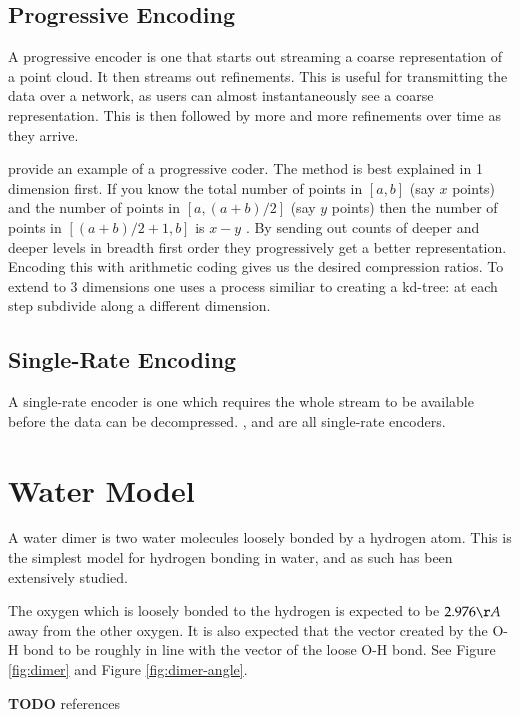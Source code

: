 \documentclass{report}
\newcommand{\todo}{\textbf{TODO} }
\begin{document}
\subsection{Progressive Encoding}

A progressive encoder is one that starts out streaming a coarse representation
of a point cloud. It then streams out refinements. This is useful for
transmitting the data over a network, as users can almost instantaneously see
a coarse representation. This is then followed by more and more refinements
over time as they arrive.

\citet{devillers2000gci} provide an example of a progressive coder. The method
is best explained in 1 dimension first. If you know the total number of points
in $[a, b]$ (say $x$ points) and the number of points in $[a, (a+b)/2]$ (say
$y$ points) then the number of points in $[(a+b)/2+1, b]$ is $x - y$ . By
sending out counts of deeper and deeper levels in breadth first order they
progressively get a better representation. Encoding this with arithmetic
coding gives us the desired compression ratios. To extend to 3 dimensions one
uses a process similiar to creating a kd-tree: at each step subdivide along a
different dimension.


\subsection{Single-Rate Encoding}

A single-rate encoder is one which requires the whole stream to be available
before the data can be decompressed. \citet{omeltchenko2000sls},
\citet{gumholdcomp} and \citet{merrycomp} are all single-rate encoders.


\section{Water Model}

A water dimer is two water molecules loosely bonded by a hydrogen atom. This
is the simplest model for hydrogen bonding in water, and as such has been
extensively studied.

The oxygen which is loosely bonded to the hydrogen is expected to be
$2.976\AA$ away from the other oxygen. It is also expected that the vector
created by the O-H bond to be roughly in line with the vector of the loose O-H
bond. See Figure \ref{fig:dimer} and Figure \ref{fig:dimer-angle}.

\todo references
\end{document}
